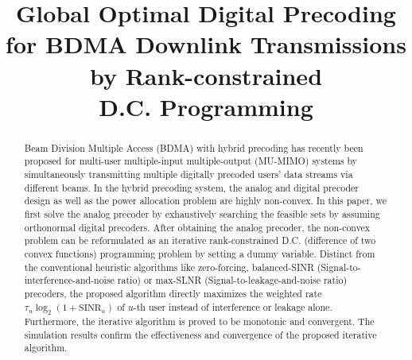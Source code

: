 \documentclass[10pt,journal,twocolumn,twoside]{IEEEtran}
\begin{document}
\title{Global Optimal Digital Precoding for BDMA Downlink Transmissions by Rank-constrained\\ D.C. Programming}
\author{}
\maketitle\thispagestyle{plain}\pagestyle{plain}

\begin{abstract}
Beam Division Multiple Access (BDMA) with hybrid precoding has recently been proposed for multi-user multiple-input multiple-output (MU-MIMO) systems by simultaneously transmitting multiple digitally precoded users' data streams via different beams. In the hybrid precoding system, the analog and digital precoder design as well as the power allocation problem are highly non-convex. In this paper, we first solve the analog precoder by exhaustively searching the feasible sets by assuming orthonormal digital precoders. After obtaining the analog precoder, the non-convex problem can be reformulated as an iterative rank-constrained D.C. (difference of two convex functions) programming problem by setting a dummy variable. Distinct from the conventional heuristic algorithms like zero-forcing, balanced-SINR (Signal-to-interference-and-noise ratio) or max-SLNR (Signal-to-leakage-and-noise ratio) precoders, the proposed algorithm directly maximizes the weighted rate $\tau_u\log_2(1+\text{SINR}_u)$ of $u$-th user instead of interference or leakage alone. Furthermore, the iterative algorithm is proved to be monotonic and convergent. The simulation results confirm the effectiveness and convergence of the proposed iterative algorithm.
\end{abstract}

\end{document}
